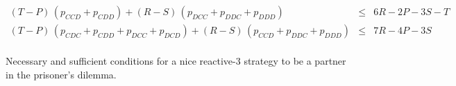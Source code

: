 \documentclass[11pt]{article}
\theoremstyle{plainCl1}
\theoremstyle{plainCl2}
\begin{document}
\begin{table}[t!]
{{\begin{equation*}
\begin{array}{rcl}
    (T - P)\,(p_{CCD} + p_{CDD}) + (R - S)\,(p_{DCC} + p_{DDC} + p_{DDD}) & \le & 6 R \!-\! 2 P \!-\! 3 S \!-\! T \\ [0.2cm]
    (T - P)\,(p_{CDC} + p_{CDD} + p_{DCC} + p_{DCD}) + (R - S)\,(p_{CCD} + p_{DDC} + p_{DDD}) & \le & 7 R \!-\! 4 P \!-\! 3 S \\ [0.2cm]
 \end{array}
 \end{equation*}
 }}
 \caption{Necessary and sufficient conditions for a nice reactive-3 strategy to be a partner in the  prisoner's dilemma.}
 \label{Tab:PartnerReactiveThreePD}
 \end{table}

\clearpage



\appendix

\end{document}
